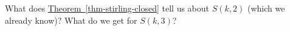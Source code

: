 \documentclass{book}
\begin{document}
\setcounter{cpjt}{286}
\addtocounter{cpjt}{-1}
\begin{activity}\label{activity-279}
\hypertarget{p-1446}{}%
What does \hyperref[thm-stirling-closed]{Theorem~\ref{thm-stirling-closed}} tell us about \(S(k, 2)\) (which we already know)?  What do we get for \(S(k,3)\)?%
\par\smallskip%
\noindent\end{activity}

\clearpage
\end{document}
